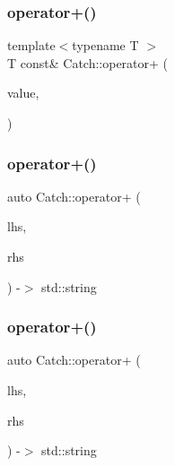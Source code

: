 \mbox{\label{namespaceCatch_a5e95b3c47a7618db3649dc39b0bb9004}} 
\subsubsection{\texorpdfstring{operator+()}{operator+()}\hspace{0.1cm}{\footnotesize\ttfamily [1/4]}}
{\footnotesize\ttfamily template$<$typename T $>$ \\
T const\& Catch\+::operator+ (\begin{DoxyParamCaption}\item[{T const \&}]{value,  }\item[{\mbox{\hyperlink{structCatch_1_1StreamEndStop}{Stream\+End\+Stop}}}]{ }\end{DoxyParamCaption})}

\mbox{\label{namespaceCatch_a3a766cb0b8c792c9151baaaf1e8003eb}} 
\subsubsection{\texorpdfstring{operator+()}{operator+()}\hspace{0.1cm}{\footnotesize\ttfamily [2/4]}}
{\footnotesize\ttfamily auto Catch\+::operator+ (\begin{DoxyParamCaption}\item[{\mbox{\hyperlink{classCatch_1_1StringRef}{String\+Ref}} const \&}]{lhs,  }\item[{\mbox{\hyperlink{classCatch_1_1StringRef}{String\+Ref}} const \&}]{rhs }\end{DoxyParamCaption}) -\/$>$  std\+::string}

\mbox{\label{namespaceCatch_ab7bdb68d0e4329df79e293f9207b55e9}} 
\subsubsection{\texorpdfstring{operator+()}{operator+()}\hspace{0.1cm}{\footnotesize\ttfamily [3/4]}}
{\footnotesize\ttfamily auto Catch\+::operator+ (\begin{DoxyParamCaption}\item[{\mbox{\hyperlink{classCatch_1_1StringRef}{String\+Ref}} const \&}]{lhs,  }\item[{char const $\ast$}]{rhs }\end{DoxyParamCaption}) -\/$>$  std\+::string}

